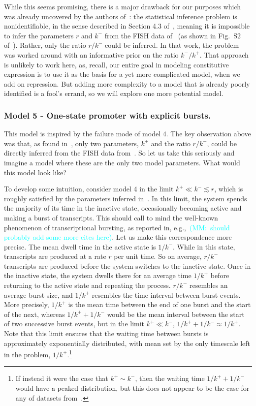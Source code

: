 \documentclass[12pt]{article}%
\newcommand{\mmnote}[1]{\textcolor{cyan}{(MM:~#1)}}
\begin{document}
While this seems promising, there is a major drawback for our purposes
which was already uncovered by the authors of~\cite{Razo-Mejia2020}:
the statistical inference problem is nonidentifiable,
in the sense described in Section 4.3 of~\cite{Gelman2013},
meaning it is impossible to infer the
parameters $r$ and $k^-$ from the FISH data of~\cite{Jones2014}
(as shown in Fig.~S2 of~\cite{Razo-Mejia2020}).
Rather, only the ratio $r/k^-$ could be inferred. In that work,
the problem was worked around with an informative prior on the
ratio $k^-/k^+$. That approach is unlikely to work here, as,
recall, our entire goal in modeling constitutive expression is to
use it as the basis for a yet more complicated model, when we add
on repression. But adding more complexity to a model that is
already poorly identified is a fool's errand,
so we will explore one more potential model.

\subsubsection{Model 5 - One-state promoter with explicit bursts.}
This model is inspired by the failure mode of model 4.
The key observation above was that, as found
in~\cite{Razo-Mejia2020}, only two parameters, $k^+$ and the
ratio $r/k^-$, could be directly inferred from the FISH data
from~\cite{Jones2014}.
So let us take this seriously and imagine a model where these are
the only two model parameters. What would this model look like?

To develop some intuition, consider model 4 in the limit
$k^+ \ll k^- \lesssim r$, which is roughly satisfied by the
parameters inferred in~\cite{Razo-Mejia2020}.
In this limit, the system spends the majority of its time in the inactive state, occasionally becoming active and making a burst of transcripts.
This should call to mind the well-known phenomenon of transcriptional bursting, as reported in, e.g.,~\cite{Golding2005,Chong2014,Sevier2016}\mmnote{should probably add some more cites here}.
Let us make this correspondence more precise.
The mean dwell time in the active state is $1/k^-$.
While in this state, transcripts are produced at a rate $r$ per
unit time. So on average, $r/k^-$ transcripts are produced before
the system switches to the inactive state. Once in the inactive
state, the system dwells there for an average time $1/k^+$ before
returning to the active state and repeating the process. $r/k^-$
resembles an average burst size, and $1/k^+$ resembles the time
interval between burst events. More precisely, $1/k^+$ is the
mean time between the end of one burst and the start of the next,
whereas $1/k^+ + 1/k^-$ would be the mean interval between the
start of two successive burst events, but in the limit $k^+ \ll
k^-$, $1/k^+ + 1/k^- \approx 1/k^+$. Note that this limit ensures
that the waiting time between bursts is approximately
exponentially distributed, with mean set by the only timescale
left in the problem,
$1/k^+$.\footnote{
If instead it were the case that $k^+ \sim k^-$, then the waiting time
$1/k^+ + 1/k^-$ would have a peaked distribution, but this does
not appear to be the case for any of datasets
from~\cite{Jones2014}.}
\end{document}
